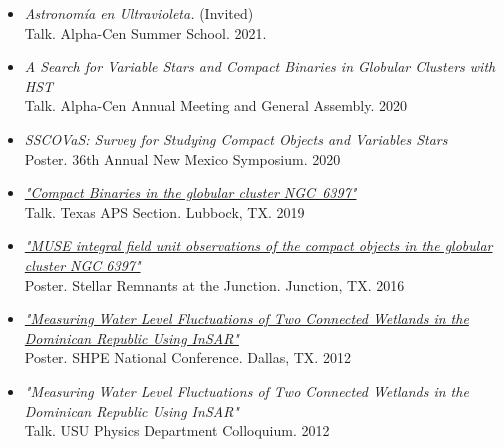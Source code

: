 \documentclass[letterpaper,10pt]{article}
\begin{document}
\begin{itemize}[label=$\blacktriangleright$]
\item \textit{Astronom\'ia en Ultravioleta.} (Invited)\\ Talk. Alpha-Cen Summer School. 2021.

\item \textit{A Search for Variable Stars and Compact Binaries in Globular Clusters with HST}\\ Talk. Alpha-Cen Annual Meeting and General Assembly. 2020


\item \textit{SSCOVaS: Survey for Studying Compact Objects and Variables Stars}\\ Poster. 36th Annual New Mexico Symposium. 2020

\item \textit{\href{https://manuelpm.me/TexasAPS2019/}{"Compact Binaries in the globular cluster NGC~6397"}} \\Talk. Texas APS Section. Lubbock, TX. 2019



\item \textit{\href{http://manuelpm.me/papers/MUSEposter.pdf}{"MUSE integral field unit observations of the compact objects in the globular cluster NGC 6397"}} \\Poster. Stellar Remnants at the Junction. Junction, TX. 2016




\item \textit{\href{http://manuelpm.me/papers/posterinsar.pdf}{"Measuring Water Level Fluctuations of Two Connected Wetlands in the Dominican Republic Using InSAR"}} \\Poster. SHPE National Conference. Dallas, TX. 2012

\item \emph{"Measuring Water Level Fluctuations of Two Connected Wetlands in the Dominican Republic Using InSAR"}\\
Talk. USU Physics Department Colloquium. 2012
\end{itemize}

\end{document}
